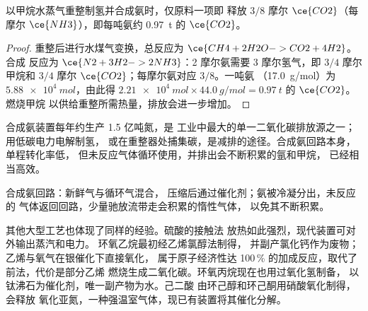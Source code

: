 \begin{proposition}[合成氨产生的二氧化碳]\label{prop:b3:green-industrial:smr}
以甲烷水蒸气重整制氢并合成氨时，仅原料一项即
释放 $3/8$ 摩尔 $\ce{CO2}$（每摩尔 $\ce{NH3}$），即每吨氨约 \qty{0.97}{t} 的 $\ce{CO2}$。
\end{proposition}

\begin{proof}
重整后进行水煤气变换，总反应为 $\ce{CH4 + 2H2O -> CO2 + 4H2}$。合成
反应为 $\ce{N2 + 3H2 -> 2NH3}$：2 摩尔氨需要 3 摩尔氢气，即 $3/4$ 摩尔
甲烷和 $3/4$ 摩尔 $\ce{CO2}$；每摩尔氨对应 $3/8$。一吨氨
（\qty{17.0}{g/mol}）为 $\qty{5.88e4}{mol}$，由此得 $\qty{2.21e4}{mol} \times \qty{44.0}{g/mol} = \qty{0.97}{t}$ 的 $\ce{CO2}$。燃烧甲烷
以供给重整所需热量，排放会进一步增加。
\end{proof}

合成氨装置每年约生产 1.5 亿吨氮，是
工业中最大的单一二氧化碳排放源之一；用低碳电力电解制氢，
或在重整器处捕集碳，是减排的途径。合成氨回路本身，
单程转化率低，
但未反应气体循环使用，并排出会不断积累的氩和甲烷，
已经相当高效。

\begin{omfigure}

{\small 合成氨回路：新鲜气与循环气混合，
压缩后通过催化剂；氨被冷凝分出，未反应的
气体返回回路，少量驰放流带走会积累的惰性气体，
以免其不断积累。}
\end{omfigure}

其他大型工艺也体现了同样的经验。硫酸的接触法
放热如此强烈，现代装置可对外输出蒸汽和电力。
环氧乙烷最初经乙烯氯醇法制得，
并副产氯化钙作为废物；乙烯与氧气在银催化下直接氧化，
属于原子经济性达 100\,\% 的加成反应，取代了前法，代价是部分乙烯
燃烧生成二氧化碳。环氧丙烷现在也用过氧化氢制备，
以钛沸石为催化剂，唯一副产物为水。己二酸
由环己醇和环己酮用硝酸氧化制得，会释放
氧化亚氮，一种强温室气体，现已有装置将其催化分解。

